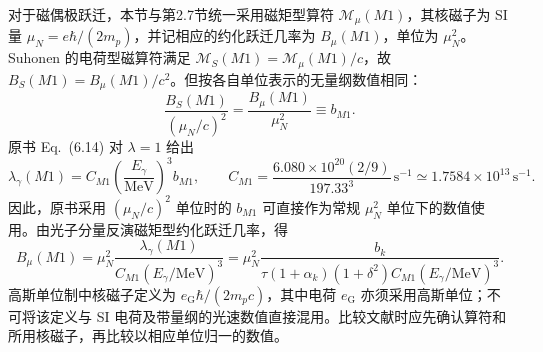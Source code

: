 对于磁偶极跃迁，本节与第2.7节统一采用磁矩型算符 $\mathcal M_{\mu}(M1)$，其核磁子为 SI 量 $\mu_N=e\hbar/(2m_p)$，并记相应的约化跃迁几率为 $B_{\mu}(M1)$，单位为 $\mu_N^2$。Suhonen 的电荷型磁算符满足 $\mathcal M_{S}(M1)=\mathcal M_{\mu}(M1)/c$，故 $B_{S}(M1)=B_{\mu}(M1)/c^2$。但按各自单位表示的无量纲数值相同：
\begin{equation}
\frac{B_{S}(M1)}{(\mu_N/c)^2}=\frac{B_{\mu}(M1)}{\mu_N^2}\equiv b_{M1}.
\end{equation}
原书 Eq.~(6.14) 对 $\lambda=1$ 给出~\cite{book-suhonen-from-nucleons-to-nucleus}
\begin{equation}\label{eq:5-9-cm1}
\lambda_\gamma(M1)=C_{M1}\left(\frac{E_\gamma}{\mathrm{MeV}}\right)^3 b_{M1},\qquad
C_{M1}=\frac{6.080\times10^{20}(2/9)}{197.33^3}\,\mathrm{s}^{-1}\simeq 1.7584\times10^{13}\,\mathrm{s}^{-1}.
\end{equation}
因此，原书采用 $(\mu_N/c)^2$ 单位时的 $b_{M1}$ 可直接作为常规 $\mu_N^2$ 单位下的数值使用。由光子分量反演磁矩型约化跃迁几率，得
\begin{equation}\label{eq:5-9-bm1-extracted}
B_{\mu}(M1)=\mu_N^2\frac{\lambda_\gamma(M1)}{C_{M1}(E_\gamma/\mathrm{MeV})^3}
=\mu_N^2\frac{b_k}{\tau(1+\alpha_k)(1+\delta^2)C_{M1}(E_\gamma/\mathrm{MeV})^3}.
\end{equation}
高斯单位制中核磁子定义为 $e_{\mathrm G}\hbar/(2m_pc)$，其中电荷 $e_{\mathrm G}$ 亦须采用高斯单位；不可将该定义与 SI 电荷及带量纲的光速数值直接混用。比较文献时应先确认算符和所用核磁子，再比较以相应单位归一的数值。
